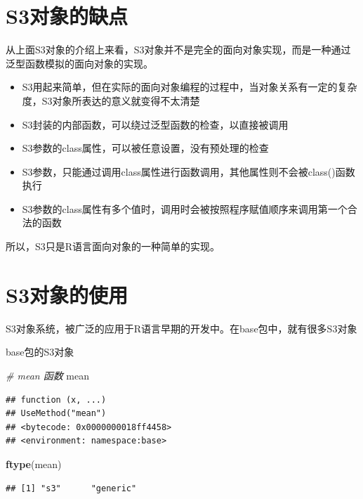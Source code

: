 \documentclass[]{book}
\newenvironment{Shaded}{\begin{snugshade}}{\end{snugshade}}
\newcommand{\KeywordTok}[1]{\textcolor[rgb]{0.13,0.29,0.53}{\textbf{#1}}}
\newcommand{\CommentTok}[1]{\textcolor[rgb]{0.56,0.35,0.01}{\textit{#1}}}
\newcommand{\NormalTok}[1]{#1}
\begin{document}
\section{S3对象的缺点}\label{s3}

从上面S3对象的介绍上来看，S3对象并不是完全的面向对象实现，而是一种通过泛型函数模拟的面向对象的实现。

\begin{itemize}
\item
  S3用起来简单，但在实际的面向对象编程的过程中，当对象关系有一定的复杂度，S3对象所表达的意义就变得不太清楚
\item
  S3封装的内部函数，可以绕过泛型函数的检查，以直接被调用
\item
  S3参数的class属性，可以被任意设置，没有预处理的检查
\item
  S3参数，只能通过调用class属性进行函数调用，其他属性则不会被class()函数执行
\item
  S3参数的class属性有多个值时，调用时会被按照程序赋值顺序来调用第一个合法的函数
\end{itemize}

所以，S3只是R语言面向对象的一种简单的实现。

\section{S3对象的使用}\label{s3}

S3对象系统，被广泛的应用于R语言早期的开发中。在base包中，就有很多S3对象

base包的S3对象

\begin{Shaded}
\begin{Highlighting}[]
\CommentTok{# mean 函数}
\NormalTok{mean}
\end{Highlighting}
\end{Shaded}

\begin{verbatim}
## function (x, ...) 
## UseMethod("mean")
## <bytecode: 0x0000000018ff4458>
## <environment: namespace:base>
\end{verbatim}

\begin{Shaded}
\begin{Highlighting}[]
\KeywordTok{ftype}\NormalTok{(mean)}
\end{Highlighting}
\end{Shaded}

\begin{verbatim}
## [1] "s3"      "generic"
\end{verbatim}
\end{document}
